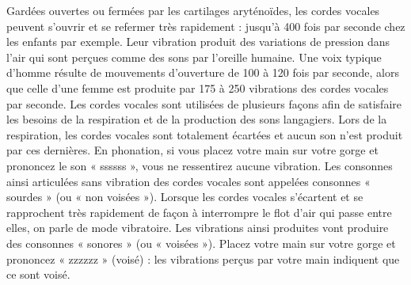 Gardées ouvertes ou fermées par les cartilages aryténoïdes, les cordes vocales peuvent s’ouvrir et se refermer très rapidement : jusqu’à 400 fois par seconde chez les enfants par exemple. Leur vibration produit des variations de pression dans l’air qui sont perçues comme des sons par l’oreille humaine. Une voix typique d’homme résulte de mouvements d’ouverture de 100 à 120 fois par seconde, alors que celle d’une femme est produite par 175 à 250 vibrations des cordes vocales par seconde.
Les cordes vocales sont utilisées de plusieurs façons afin de satisfaire les besoins de la respiration et de la production des sons langagiers.
Lors de la respiration, les cordes vocales sont totalement écartées et aucun son n’est produit par ces dernières. En phonation, si vous placez votre main sur votre gorge et prononcez le son « ssssss », vous ne ressentirez aucune vibration. Les consonnes ainsi articulées sans vibration des cordes vocales sont appelées consonnes « sourdes » (ou « non voisées »).
Lorsque les cordes vocales s’écartent et se rapprochent très rapidement de façon à interrompre le flot d’air qui passe entre elles, on parle de mode vibratoire. Les vibrations ainsi produites vont produire des consonnes « sonores » (ou « voisées »). Placez votre main sur votre gorge et prononcez « zzzzzz » (voisé) : les vibrations perçus par votre main indiquent que ce sont voisé.
